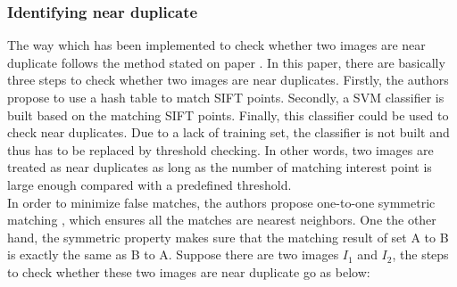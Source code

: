 \subsubsection{Identifying near duplicate}
The way which has been implemented to check whether two images are near duplicate follows the method stated on paper \cite{zhao2007near}. In this paper, there are basically three steps to check whether two images are near duplicates. Firstly, the authors propose to use a hash table to match SIFT points. Secondly, a SVM classifier is built based on the matching SIFT points. Finally, this classifier could be used to check near duplicates. Due to a lack of training set, the classifier is not built and thus has to be replaced by threshold checking. In other words, two images are treated as near duplicates as long as the number of matching interest point is large enough compared with a predefined threshold. \\

\noindent In order to minimize false matches, the authors propose one-to-one symmetric matching \cite{zhao2007near}, which ensures all the matches are nearest neighbors. One the other hand, the symmetric property makes sure that the matching result of set A to B is exactly the same as B to A. Suppose there are two images $I_1$ and $I_2$, the steps to check whether these two images are near duplicate go as below:

